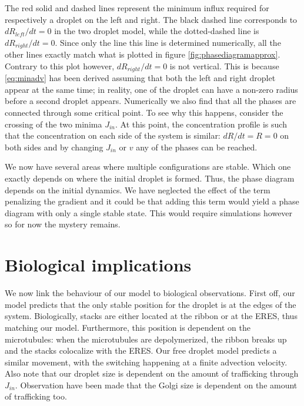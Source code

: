 \documentclass{Dissertate}
\begin{document}
The red solid and dashed lines represent the minimum influx required for
respectively a droplet on the left and right. The black dashed line
corresponds to \(dR_{left}/dt=0\) in the two droplet model, while the
dotted-dashed line is \(dR_{right}/dt=0\). Since only the line this line
is determined numerically, all the other lines exactly match what is
plotted in figure \ref{fig:phasediagramapprox}. Contrary to this
plot however, \(dR_{right}/dt=0\) is not vertical. This is because
\ref{eq:minadv} has been derived assuming that both the left and
right droplet appear at the same time; in reality, one of the droplet
can have a non-zero radius before a second droplet appears. Numerically
we also find that all the phases are connected through some critical
point. To see why this happens, consider the crossing of the two minima
\(J_{in}\). At this point, the concentration profile is such that the
concentration on each side of the system is similar: \(dR/dt=R=0\) on
both sides and by changing \(J_{in}\) or \(v\) any of the phases can be
reached.

We now have several areas where multiple configurations are stable.
Which one exactly depends on where the initial droplet is formed. Thus,
the phase diagram depends on the initial dynamics. We have neglected the
effect of the term penalizing the gradient and it could be that adding
this term would yield a phase diagram with only a single stable state.
This would require simulations however so for now the mystery remains.

\hypertarget{biological-implications}{%
\section{Biological implications}\label{biological-implications}}

We now link the behaviour of our model to biological observations. First
off, our model predicts that the only stable position for the droplet is
at the edges of the system. Biologically, stacks are either located at
the ribbon or at the ERES, thus matching our model. Furthermore, this
position is dependent on the microtubules: when the microtubules are
depolymerized, the ribbon breaks up and the stacks colocalize with the
ERES. Our free droplet model predicts a similar movement, with the
switching happening at a finite advection velocity. Also note that our
droplet size is dependent on the amount of trafficking through
\(J_{in}\). Observation have been made that the Golgi size is dependent
on the amount of trafficking too.
\end{document}
